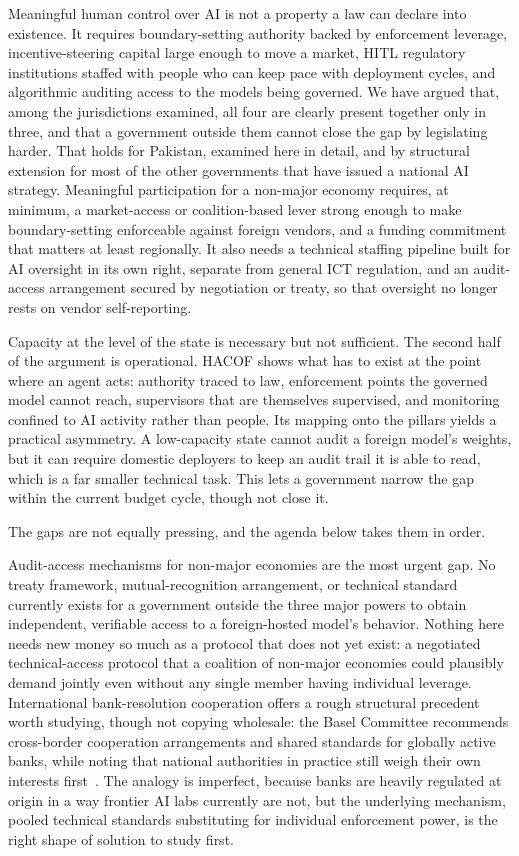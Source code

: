 \documentclass{ieeeaccess}
\newcommand{\hacof}{HACOF}
\begin{document}
Meaningful human control over AI is not a property a law can declare into existence. It requires boundary-setting authority backed by enforcement leverage, incentive-steering capital large enough to move a market, HITL regulatory institutions staffed with people who can keep pace with deployment cycles, and algorithmic auditing access to the models being governed. We have argued that, among the jurisdictions examined, all four are clearly present together only in three, and that a government outside them cannot close the gap by legislating harder. That holds for Pakistan, examined here in detail, and by structural extension for most of the other governments that have issued a national AI strategy. Meaningful participation for a non-major economy requires, at minimum, a market-access or coalition-based lever strong enough to make boundary-setting enforceable against foreign vendors, and a funding commitment that matters at least regionally. It also needs a technical staffing pipeline built for AI oversight in its own right, separate from general ICT regulation, and an audit-access arrangement secured by negotiation or treaty, so that oversight no longer rests on vendor self-reporting.

Capacity at the level of the state is necessary but not sufficient. The second half of the argument is operational. \hacof{} shows what has to exist at the point where an agent acts: authority traced to law, enforcement points the governed model cannot reach, supervisors that are themselves supervised, and monitoring confined to AI activity rather than people. Its mapping onto the pillars yields a practical asymmetry. A low-capacity state cannot audit a foreign model's weights, but it can require domestic deployers to keep an audit trail it is able to read, which is a far smaller technical task. This lets a government narrow the gap within the current budget cycle, though not close it.

The gaps are not equally pressing, and the agenda below takes them in order.

Audit-access mechanisms for non-major economies are the most urgent gap. No treaty framework, mutual-recognition arrangement, or technical standard currently exists for a government outside the three major powers to obtain independent, verifiable access to a foreign-hosted model's behavior. Nothing here needs new money so much as a protocol that does not yet exist: a negotiated technical-access protocol that a coalition of non-major economies could plausibly demand jointly even without any single member having individual leverage. International bank-resolution cooperation offers a rough structural precedent worth studying, though not copying wholesale: the Basel Committee recommends cross-border cooperation arrangements and shared standards for globally active banks, while noting that national authorities in practice still weigh their own interests first~\cite{baselcommittee2010crossborder}.
The analogy is imperfect, because banks are heavily regulated at origin in a way frontier AI labs currently are not, but the underlying mechanism, pooled technical standards substituting for individual enforcement power, is the right shape of solution to study first.
\end{document}
